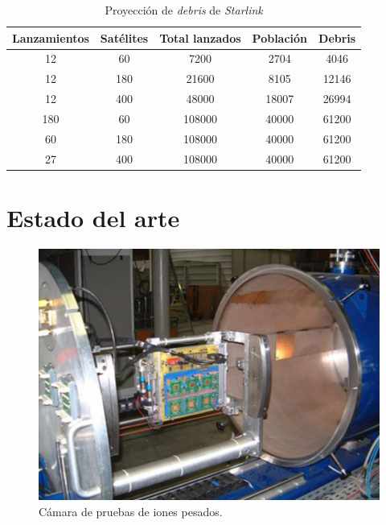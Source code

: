 \begin{table}[h]
	\centering
    \caption[Proyección de \emph{debris}]{Proyección de \emph{debris} de \emph{Starlink}\citep{ARTICLE:cibils}}
	\begin{tabular}{c c c c c}    
		\toprule
        \textbf{Lanzamientos} & \textbf{Satélites} & \textbf{Total lanzados} & \textbf{Población} & \textbf{Debris}\\
		\midrule
        12                    & 60                 & 7200                    & 2704               & 4046\\		
        12                    & 180                & 21600                   & 8105               & 12146\\		
        12                    & 400                & 48000                   & 18007              & 26994\\		
        180                   & 60                 & 108000                  & 40000              & 61200\\		
        60                    & 180                & 108000                  & 40000              & 61200\\		
        27                    & 400                & 108000                  & 40000              & 61200\\		
		\bottomrule
		\hline
	\end{tabular}
	\label{tab:starlinkdebris}
\end{table}

\section{Estado del arte}
\label{sec:arte}

\begin{figure}[htbp]
	\centering
	\includegraphics[width=.8\textwidth]{./Figures/heavy_ion_latchup_tests_in_louvain_la_neuve.jpg}
    \caption{Cámara de pruebas de iones pesados\citep{WEBSITE:heavy_ion}.}
	\label{fig:iones}
\end{figure}

